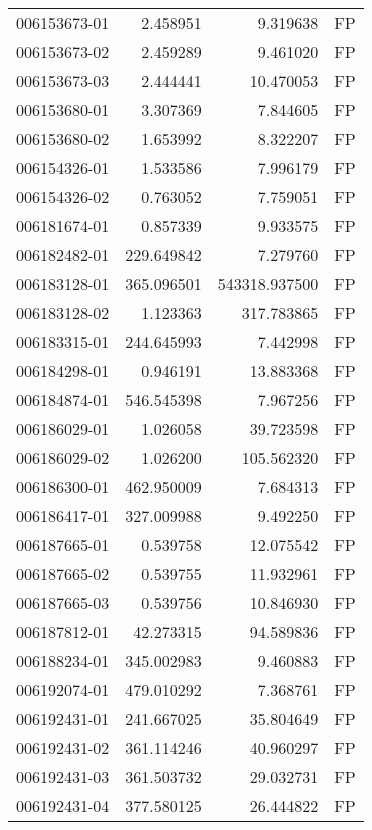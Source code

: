 \begin{tabular}{lrrl}
006153673-01 &    2.458951 &       9.319638 &   FP \\
006153673-02 &    2.459289 &       9.461020 &   FP \\
006153673-03 &    2.444441 &      10.470053 &   FP \\
006153680-01 &    3.307369 &       7.844605 &   FP \\
006153680-02 &    1.653992 &       8.322207 &   FP \\
006154326-01 &    1.533586 &       7.996179 &   FP \\
006154326-02 &    0.763052 &       7.759051 &   FP \\
006181674-01 &    0.857339 &       9.933575 &   FP \\
006182482-01 &  229.649842 &       7.279760 &   FP \\
006183128-01 &  365.096501 &  543318.937500 &   FP \\
006183128-02 &    1.123363 &     317.783865 &   FP \\
006183315-01 &  244.645993 &       7.442998 &   FP \\
006184298-01 &    0.946191 &      13.883368 &   FP \\
006184874-01 &  546.545398 &       7.967256 &   FP \\
006186029-01 &    1.026058 &      39.723598 &   FP \\
006186029-02 &    1.026200 &     105.562320 &   FP \\
006186300-01 &  462.950009 &       7.684313 &   FP \\
006186417-01 &  327.009988 &       9.492250 &   FP \\
006187665-01 &    0.539758 &      12.075542 &   FP \\
006187665-02 &    0.539755 &      11.932961 &   FP \\
006187665-03 &    0.539756 &      10.846930 &   FP \\
006187812-01 &   42.273315 &      94.589836 &   FP \\
006188234-01 &  345.002983 &       9.460883 &   FP \\
006192074-01 &  479.010292 &       7.368761 &   FP \\
006192431-01 &  241.667025 &      35.804649 &   FP \\
006192431-02 &  361.114246 &      40.960297 &   FP \\
006192431-03 &  361.503732 &      29.032731 &   FP \\
006192431-04 &  377.580125 &      26.444822 &   FP \\

\end{tabular}
